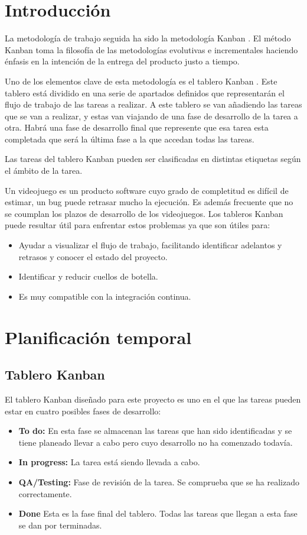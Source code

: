 
\section{Introducción}
La metodología de trabajo seguida ha sido la metodología Kanban \cite{wiki:Kanban}. El método Kanban toma la filosofía de las metodologías evolutivas e incrementales haciendo énfasis en la intención de la entrega del producto justo a tiempo.

Uno de los elementos clave de esta metodología es el tablero Kanban \cite{TableroKanban}. Este tablero está dividido en una serie de apartados definidos que representarán el flujo de trabajo de las tareas a realizar. A este tablero se van añadiendo las tareas que se van a realizar, y estas van viajando de una fase de desarrollo de la tarea a otra. Habrá una fase de desarrollo final que represente que esa tarea esta completada que será la última fase a la que accedan todas las tareas.

Las tareas del tablero Kanban pueden ser clasificadas en distintas etiquetas según el ámbito de la tarea.

Un videojuego es un producto software cuyo grado de completitud es difícil de estimar, un bug puede retrasar mucho la ejecución. Es además frecuente que no se coumplan los plazos de desarrollo de los videojuegos. Los tableros Kanban puede resultar útil para enfrentar estos problemas ya que son útiles para:
\begin{itemize}
\item
Ayudar a visualizar el flujo de trabajo, facilitando identificar adelantos y retrasos y conocer el estado del proyecto.
\item
Identificar y reducir cuellos de botella.
\item
Es muy compatible con la integración continua.
\end{itemize}

\section{Planificación temporal}
\subsection{Tablero Kanban}
El tablero Kanban diseñado para este proyecto es uno en el que las tareas pueden estar en cuatro posibles fases de desarrollo:
\begin{itemize}
\item
\textbf{To do:} En esta fase se almacenan las tareas que han sido identificadas y se tiene planeado llevar a cabo pero cuyo desarrollo no ha comenzado todavía.
\item
\textbf{In progress:} La tarea está siendo llevada a cabo.
\item
\textbf{QA/Testing:} Fase de revisión de la tarea. Se comprueba que se ha realizado correctamente.
\item
\textbf{Done} Esta es la fase final del tablero. Todas las tareas que llegan a esta fase se dan por terminadas.
\end{itemize} 


